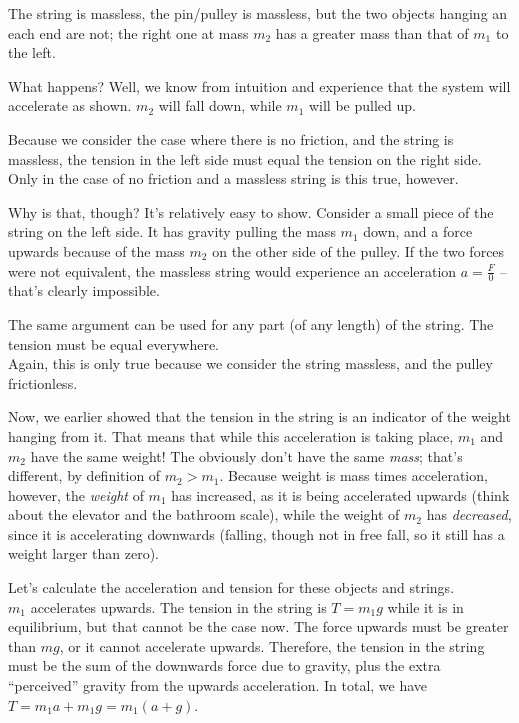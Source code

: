 The string is massless, the pin/pulley is massless, but the two objects hanging an each end are not; the right one at mass $m_2$ has a greater mass than that of $m_1$ to the left.

What happens? Well, we know from intuition and experience that the system will accelerate as shown. $m_2$ will fall down, while $m_1$ will be pulled up.

Because we consider the case where there is no friction, and the string is massless, the tension in the left side must equal the tension on the right side. Only in the case of no friction and a massless string is this true, however.

Why is that, though? It's relatively easy to show. Consider a small piece of the string on the left side. It has gravity pulling the mass $m_1$ down, and a force upwards because of the mass $m_2$ on the other side of the pulley. If the two forces were not equivalent, the massless string would experience an acceleration $a = \frac{F}{0}$ -- that's clearly impossible.	

The same argument can be used for any part (of any length) of the string. The tension must be equal everywhere.\\
Again, this is only true because we consider the string massless, and the pulley frictionless.

Now, we earlier showed that the tension in the string is an indicator of the weight hanging from it. That means that while this acceleration is taking place, $m_1$ and $m_2$ have the same weight! The obviously don't have the same \emph{mass}; that's different, by definition of $m_2 > m_1$. Because weight is mass times acceleration, however, the \emph{weight} of $m_1$ has increased, as it is being accelerated upwards (think about the elevator and the bathroom scale), while the weight of $m_2$ has \emph{decreased}, since it is accelerating downwards (falling, though not in free fall, so it still has a weight larger than zero).

Let's calculate the acceleration and tension for these objects and strings.\\
$m_1$ accelerates upwards. The tension in the string is $T = m_1 g$ while it is in equilibrium, but that cannot be the case now. The force upwards must be greater than $m g$, or it cannot accelerate upwards. Therefore, the tension in the string must be the sum of the downwards force due to gravity, plus the extra ``perceived'' gravity from the upwards acceleration. In total, we have $T = m_1 a + m_1 g = m_1(a + g)$.

